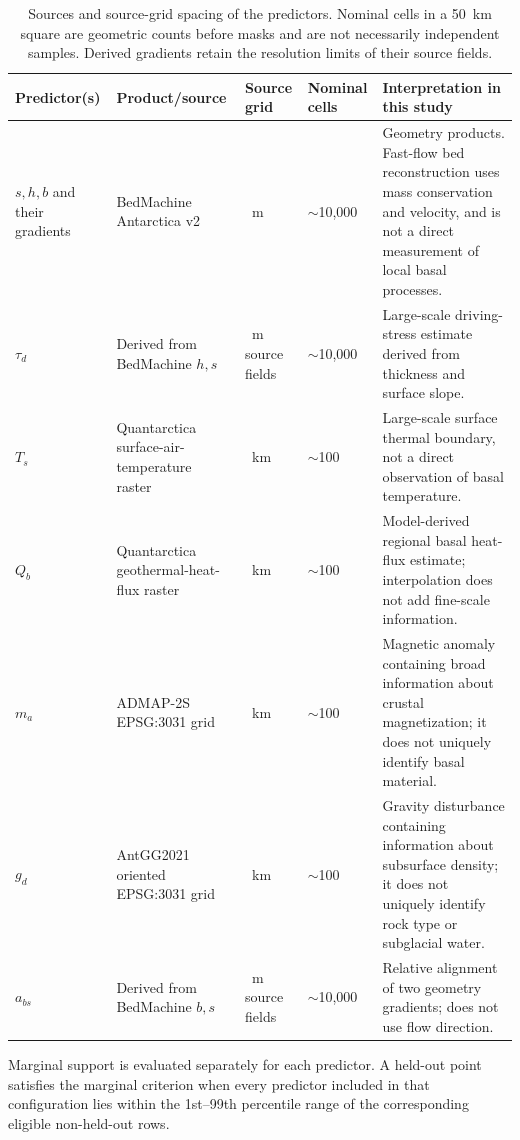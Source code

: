 \documentclass[review,jog]{igs}
\providecommand{\toprule}{\hline}
\providecommand{\midrule}{\hline}
\providecommand{\bottomrule}{\hline}
\begin{document}
\begin{table}
\caption{Sources and source-grid spacing of the predictors. Nominal cells
in a 50~km square are geometric counts before masks and are not necessarily
independent samples. Derived gradients retain the resolution limits of their
source fields.}
\label{tab:predictor_provenance}
\centering\scriptsize
\setlength{\tabcolsep}{3pt}
\begin{tabular}{>{\raggedright\arraybackslash}p{}
                >{\raggedright\arraybackslash}p{}
                >{\centering\arraybackslash}p{}
                >{\centering\arraybackslash}p{}
                >{\raggedright\arraybackslash}p{}}
\toprule
Predictor(s) & Product/source & Source grid & Nominal cells & Interpretation in this study\\
\midrule
$s,h,b$ and their gradients & BedMachine Antarctica v2 & 500~m & $\sim$10,000 & Geometry products. Fast-flow bed reconstruction uses mass conservation and velocity, and is not a direct measurement of local basal processes.\\
$\tau_d$ & Derived from BedMachine $h,s$ & 500~m source fields & $\sim$10,000 & Large-scale driving-stress estimate derived from thickness and surface slope.\\
$T_s$ & Quantarctica surface-air-temperature raster & 5~km & $\sim$100 & Large-scale surface thermal boundary, not a direct observation of basal temperature.\\
$Q_b$ & Quantarctica geothermal-heat-flux raster & 5~km & $\sim$100 & Model-derived regional basal heat-flux estimate; interpolation does not add fine-scale information.\\
$m_a$ & ADMAP-2S EPSG:3031 grid & 5~km & $\sim$100 & Magnetic anomaly containing broad information about crustal magnetization; it does not uniquely identify basal material.\\
$g_d$ & AntGG2021 oriented EPSG:3031 grid & 5~km & $\sim$100 & Gravity disturbance containing information about subsurface density; it does not uniquely identify rock type or subglacial water.\\
$a_{bs}$ & Derived from BedMachine $b,s$ & 500~m source fields & $\sim$10,000 & Relative alignment of two geometry gradients; does not use flow direction.\\
\bottomrule
\end{tabular}
\end{table}

Marginal support is evaluated separately for each predictor. A held-out point
satisfies the marginal criterion when every predictor included in that
configuration lies within the 1st--99th percentile range of the corresponding
eligible non-held-out rows.
\end{document}
